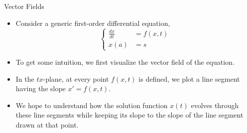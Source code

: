 \documentclass{beamer}
\newcommand{\beforeverb}{\footnotesize}
\newcommand{\afterverb}{\normalsize}
\begin{document}
\begin{frame}{Vector Fields}
\begin{itemize}
\item Consider a generic first-order differential equation,
\beforeverb
\[
\left\{
\begin{split}
\frac{dx}{dt}&=f(x,t)\\ 
x(a) &= s
\end{split}\right.
\]
\afterverb
\item To get some intuition, we first visualize the \alert{vector field} of the equation.
\item In the $tx$-plane, at every point $f(x, t)$ is defined, we plot a line segment having the slope $x'=f(x,t)$. 
\item We hope to understand how the \alert{ solution function $x(t)$} evolves through these line segments  while keeping its slope  to the slope of the line segment drawn at that point.
\end{itemize}
\end{frame}
\end{document}
